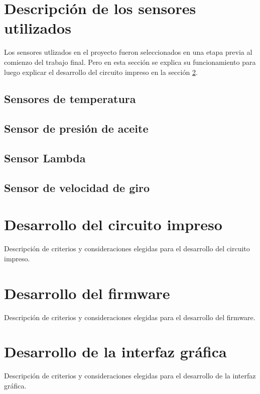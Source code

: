 \section{Descripción de los sensores utilizados}

Los sensores utlizados en el proyecto fueron seleccionados en una etapa previa al comienzo del trabajo final. Pero en esta sección se explica su funcionamiento para luego explicar el desarrollo del circuito impreso en la sección \ref{circuito}.

\subsection{Sensores de temperatura}



\subsection{Sensor de presión de aceite}

\subsection{Sensor Lambda}

\subsection{Sensor de velocidad de giro}

\section{Desarrollo del circuito impreso} \label{circuito}

Descripción de criterios y consideraciones elegidas para el desarrollo del circuito impreso.

\section{Desarrollo del firmware}

Descripción de criterios y consideraciones elegidas para el desarrollo del firmware.

\section{Desarrollo de la interfaz gráfica}

Descripción de criterios y consideraciones elegidas para el desarrollo de la interfaz gráfica.

